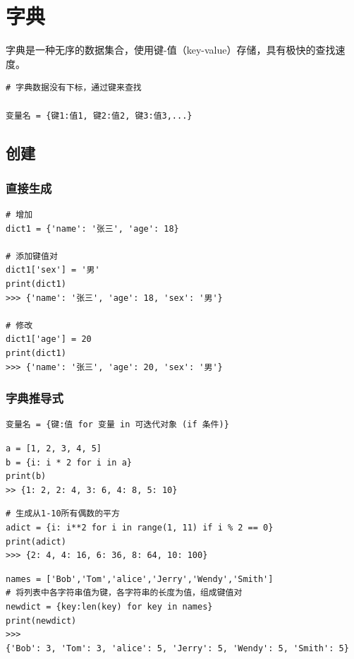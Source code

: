 \section{字典}
字典是一种无序的数据集合，使用键-值（key-value）存储，具有极快的查找速度。
\begin{lstlisting}[style=demostyle,numbers=none]
# 字典数据没有下标，通过键来查找

变量名 = {键1:值1, 键2:值2, 键3:值3,...}
\end{lstlisting}


\subsection{创建}
\subsubsection{直接生成}
\begin{lstlisting}[style=demostyle,numbers=none]
# 增加
dict1 = {'name': '张三', 'age': 18}

# 添加键值对
dict1['sex'] = '男'
print(dict1)
>>> {'name': '张三', 'age': 18, 'sex': '男'}

# 修改
dict1['age'] = 20
print(dict1)
>>> {'name': '张三', 'age': 20, 'sex': '男'}
\end{lstlisting}


\subsubsection{字典推导式}
\begin{lstlisting}[style=demostyle,numbers=none]
变量名 = {键:值 for 变量 in 可迭代对象 (if 条件)}
\end{lstlisting}

\begin{lstlisting}[style=pythonstyle]
a = [1, 2, 3, 4, 5]
b = {i: i * 2 for i in a}
print(b)
>> {1: 2, 2: 4, 3: 6, 4: 8, 5: 10}
\end{lstlisting}

\begin{lstlisting}[style=pythonstyle]
# 生成从1-10所有偶数的平方
adict = {i: i**2 for i in range(1, 11) if i % 2 == 0}
print(adict)
>>> {2: 4, 4: 16, 6: 36, 8: 64, 10: 100}
\end{lstlisting}

\begin{lstlisting}[style=pythonstyle]
names = ['Bob','Tom','alice','Jerry','Wendy','Smith']    
# 将列表中各字符串值为键，各字符串的长度为值，组成键值对
newdict = {key:len(key) for key in names}
print(newdict)
>>> 
{'Bob': 3, 'Tom': 3, 'alice': 5, 'Jerry': 5, 'Wendy': 5, 'Smith': 5}
\end{lstlisting}


